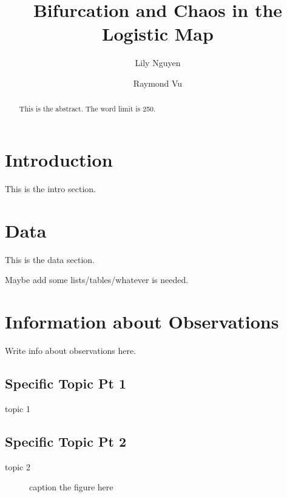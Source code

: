 \documentclass{aastex631}
\begin{document}
\title{Bifurcation and Chaos in the Logistic Map}
\author{Lily Nguyen}

\author{Raymond Vu}



\begin{abstract}
This is the abstract. The word limit is 250.
\end{abstract}

\section{Introduction} \label{sec:intro}
This is the intro section.

\section{Data} \label{sec:data}
This is the data section.

Maybe add some lists/tables/whatever is needed.



\section{Information about Observations}
Write info about observations here.

\subsection{Specific Topic Pt 1} \label{sec:subtopic1}
topic 1

\subsection{Specific Topic Pt 2} \label{sec:subtopic2}
topic 2

\begin{figure}[H]
    \centering
    \caption{caption the figure here}
    \label{fig:my_label}
\end{figure}
\end{document}

